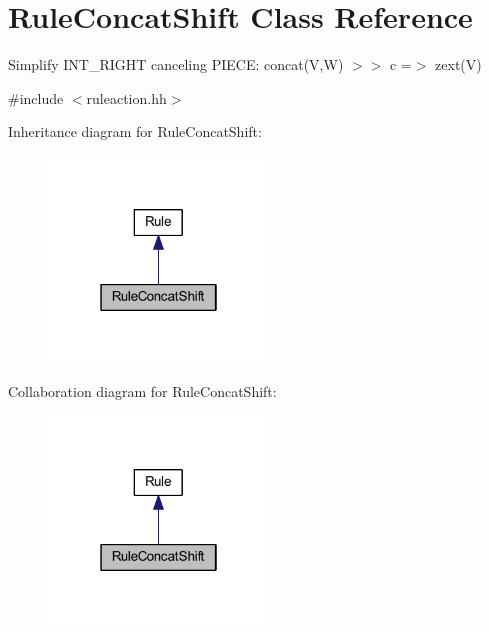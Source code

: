 \hypertarget{class_rule_concat_shift}{}\section{Rule\+Concat\+Shift Class Reference}
\label{class_rule_concat_shift}


Simplify I\+N\+T\+\_\+\+R\+I\+G\+HT canceling P\+I\+E\+CE\+: {\ttfamily concat(\+V,\+W) $>$$>$ c =$>$ zext(\+V)}  




{\ttfamily \#include $<$ruleaction.\+hh$>$}



Inheritance diagram for Rule\+Concat\+Shift\+:
\nopagebreak
\begin{figure}[H]
\begin{center}
\leavevmode
\includegraphics[width=166pt]{class_rule_concat_shift__inherit__graph}
\end{center}
\end{figure}


Collaboration diagram for Rule\+Concat\+Shift\+:
\nopagebreak
\begin{figure}[H]
\begin{center}
\leavevmode
\includegraphics[width=166pt]{class_rule_concat_shift__coll__graph}
\end{center}
\end{figure}

